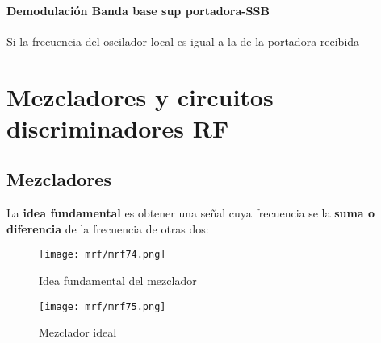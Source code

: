 \documentclass[
	12pt, %
	fleqn, %
	a4paper, %
	oneside, %
]{LegrandOrangeBook}
\begin{document}
\subsubsection*{Demodulación Banda base sup portadora-SSB}
Si la frecuencia del oscilador local es igual a la de la portadora recibida
\chapter{Mezcladores y circuitos discriminadores RF}
\section{Mezcladores}
La \textbf{idea fundamental} es obtener una señal cuya frecuencia se la \textbf{suma o diferencia} de la frecuencia de otras dos:
\begin{figure}[H]
\centering
\texttt{[image: mrf/mrf74.png]}
\caption{Idea fundamental del mezclador}
\end{figure}
\begin{figure}[H]
\centering
\texttt{[image: mrf/mrf75.png]}
\caption{Mezclador ideal}
\end{figure}
\end{document}
